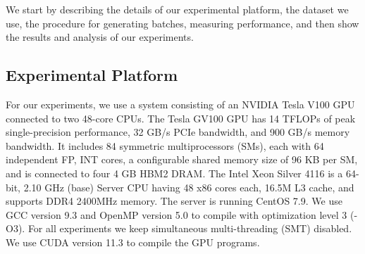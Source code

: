 We start by describing the details of our experimental platform, the dataset we use, the procedure for generating batches, measuring performance, and then show the results and analysis of our experiments. 



\subsection{Experimental Platform}

For our experiments, we use a system consisting of an NVIDIA Tesla V100 GPU connected to two 48-core CPUs. The Tesla GV100 GPU has 14 TFLOPs of peak single-precision performance, 32 GB/s PCIe bandwidth, and 900 GB/s memory bandwidth. It includes 84 symmetric multiprocessors (SMs), each with 64 independent FP, INT cores, a configurable shared memory size of 96 KB per SM, and is connected to four 4 GB HBM2 DRAM. The Intel Xeon Silver 4116 is a 64-bit, 2.10 GHz (base) Server CPU having 48 x86 cores each, 16.5M L3 cache, and supports DDR4 2400MHz memory. The server is running CentOS 7.9. We use GCC version 9.3 and OpenMP version 5.0 to compile with optimization level 3 (-O3). For all experiments we keep simultaneous multi-threading (SMT) disabled. We use CUDA version 11.3 to compile the GPU programs.




